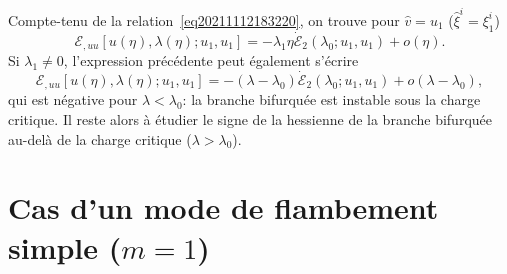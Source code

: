 \documentclass{article}
\newcommand{\nocomma}{}
\begin{document}
Compte-tenu de la relation~\eqref{eq20211112183220}, on trouve pour $\hat{v} =
u_1$ ($\hat{\xi}^i = \xi_1^i$)
\begin{equation}
  \mathcal{E}_{, u \nocomma u} [u (\eta), \lambda (\eta) ; u_1, u_1] = -
  \lambda_1 \eta \dot{\mathcal{E}}_2 (\lambda_0 ; u_1, u_1) + o (\eta) .
\end{equation}
Si $\lambda_1 \neq 0$, l'expression pr{\'e}c{\'e}dente peut {\'e}galement
s'{\'e}crire
\begin{equation}
  \mathcal{E}_{, u \nocomma u} [u (\eta), \lambda (\eta) ; u_1, u_1] = -
  (\lambda - \lambda_0)  \dot{\mathcal{E}}_2 (\lambda_0 ; u_1, u_1) + o
  (\lambda - \lambda_0),
\end{equation}
qui est n{\'e}gative pour $\lambda < \lambda_0$: la branche bifurqu{\'e}e est
instable sous la charge critique. Il reste alors {\`a} {\'e}tudier le signe de
la hessienne de la branche bifurqu{\'e}e au-del{\`a} de la charge critique
($\lambda > \lambda_0$).

\section{Cas d'un mode de flambement simple ($m = 1$)}
\end{document}
